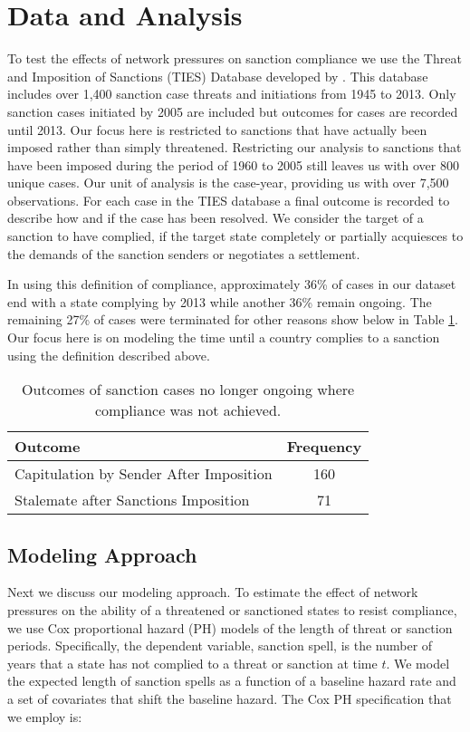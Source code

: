 \section*{Data and Analysis}
\label{empirics}

To test the effects of network pressures on sanction compliance we use the Threat and Imposition of Sanctions (TIES) Database developed by \citet{morgan2009threat}. This database includes over 1,400 sanction case threats and initiations from 1945 to 2013. Only sanction cases initiated by 2005 are included but outcomes for cases are recorded until 2013. Our focus here is restricted to sanctions that have actually been imposed rather than simply threatened. Restricting our analysis to sanctions that have been imposed during the period of 1960 to 2005 still leaves us with over 800 unique cases. Our unit of analysis is the case-year, providing us with over 7,500 observations. For each case in the TIES database a final outcome is recorded to describe how and if the case has been resolved. We consider the target of a sanction to have complied, if the target state completely or partially acquiesces to the demands of the sanction senders or negotiates a settlement.
	
In using this definition of compliance, approximately 36\% of cases in our dataset end with a state complying by 2013 while another 36\% remain ongoing. The remaining 27\% of cases were terminated for other reasons show below in Table \ref{tab:termCases}. Our focus here is on modeling the time until a country complies to a sanction using the definition described above.

\begin{table}[ht]
	\centering
	\begin{tabular}{lc}
		\hline\hline
		Outcome & Frequency \\
		\hline
		Capitulation by Sender After Imposition & 160 \\
		Stalemate after Sanctions Imposition & 71 \\
		\hline\hline
	\end{tabular}
	\caption{Outcomes of sanction cases no longer ongoing where compliance was not achieved.}
	\label{tab:termCases}	
\end{table}

\subsection*{Modeling Approach} 

Next we discuss our modeling approach. To estimate the effect of network pressures on the ability of a threatened or sanctioned states to resist compliance, we use Cox proportional hazard (PH) models of the length of threat or sanction periods. Specifically, the dependent variable, sanction spell, is the number of years that a state has not complied to a threat or sanction at time $t$. We model the expected length of sanction spells as a function of a baseline hazard rate and a set of covariates that shift the baseline hazard. The Cox PH specification that we employ is:

